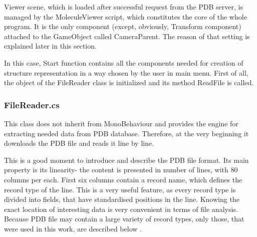 Viewer scene, which is loaded after successful request from the PDB server, is managed by the MoleculeViewer script, which constitutes the core of the whole program. It is the only component (except, obviously, Transform component) attached to the GameObject called CameraParent. The reason of that setting is explained later in this section.

In this case, Start function contains all the components needed for creation of structure representation in a way chosen by the user in main menu. First of all, the object of the FileReader class is initialized and its method ReadFile is called.

\subsubsection{FileReader.cs}

This class does not inherit from MonoBehaviour and provides the engine for extracting needed data from PDB database. Therefore, at the very beginning it downloads the PDB file and reads it line by line.

This is a good moment to introduce and describe the PDB file format. Its main property is its linearity- the content is presented in number of lines, with 80 columns per each. First six columns contain a record name, which defines the record type of the line. This is a very useful feature, as every record type is divided into fields, that have standardised positions in the line. Knowing the exact location of interesting data is very convenient in terms of file analysis. Because PDB file may contain a large variety of record types, only those, that were used in this work, are described below \cite{PDB16}.


